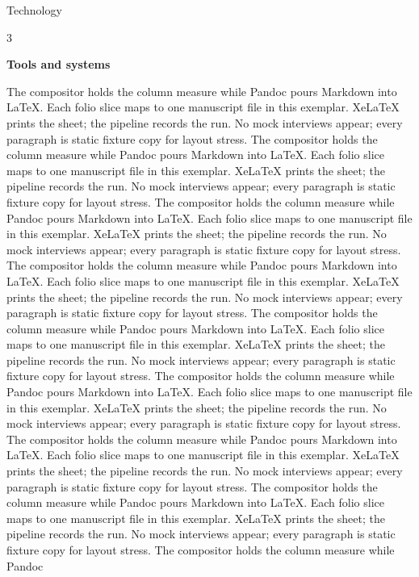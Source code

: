 \documentclass[
  ignorenonframetext,
]{beamer}
\author{\texorpdfstring{}{}}
\date{}
\begin{document}
\begin{frame}{Technology}
\protect{}\label{technology}
\begin{multicols}{3}

\textbf{Tools and systems}

The compositor holds the column measure while Pandoc pours Markdown into
LaTeX. Each folio slice maps to one manuscript file in this exemplar.
XeLaTeX prints the sheet; the pipeline records the run. No mock
interviews appear; every paragraph is static fixture copy for layout
stress. The compositor holds the column measure while Pandoc pours
Markdown into LaTeX. Each folio slice maps to one manuscript file in
this exemplar. XeLaTeX prints the sheet; the pipeline records the run.
No mock interviews appear; every paragraph is static fixture copy for
layout stress. The compositor holds the column measure while Pandoc
pours Markdown into LaTeX. Each folio slice maps to one manuscript file
in this exemplar. XeLaTeX prints the sheet; the pipeline records the
run. No mock interviews appear; every paragraph is static fixture copy
for layout stress. The compositor holds the column measure while Pandoc
pours Markdown into LaTeX. Each folio slice maps to one manuscript file
in this exemplar. XeLaTeX prints the sheet; the pipeline records the
run. No mock interviews appear; every paragraph is static fixture copy
for layout stress. The compositor holds the column measure while Pandoc
pours Markdown into LaTeX. Each folio slice maps to one manuscript file
in this exemplar. XeLaTeX prints the sheet; the pipeline records the
run. No mock interviews appear; every paragraph is static fixture copy
for layout stress. The compositor holds the column measure while Pandoc
pours Markdown into LaTeX. Each folio slice maps to one manuscript file
in this exemplar. XeLaTeX prints the sheet; the pipeline records the
run. No mock interviews appear; every paragraph is static fixture copy
for layout stress. The compositor holds the column measure while Pandoc
pours Markdown into LaTeX. Each folio slice maps to one manuscript file
in this exemplar. XeLaTeX prints the sheet; the pipeline records the
run. No mock interviews appear; every paragraph is static fixture copy
for layout stress. The compositor holds the column measure while Pandoc
pours Markdown into LaTeX. Each folio slice maps to one manuscript file
in this exemplar. XeLaTeX prints the sheet; the pipeline records the
run. No mock interviews appear; every paragraph is static fixture copy
for layout stress. The compositor holds the column measure while Pandoc

\end{multicols}
\end{frame}
\end{document}
